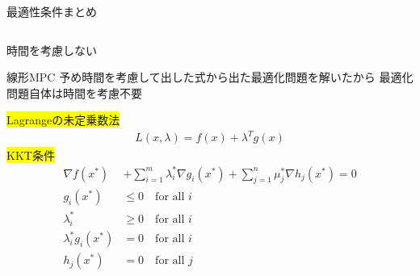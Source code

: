 \documentclass[dvipdfmx,12pt]{beamer}
\begin{document}
    \begin{frame}{最適性条件まとめ}
        \fontsize{6.5pt}{6.5pt}\selectfont
        
        \begin{columns}
            \begin{column}{.6\textwidth}
                \begin{itembox}[l]{時間を考慮しない}
                    \begin{itembox}[l]{線形MPC}
                        予め時間を考慮して出した式から出た最適化問題を解いたから
                        最適化問題自体は時間を考慮不要\\
                    \end{itembox}
                    \colorbox{yellow}{Lagrangeの未定乗数法}\\
                    \begin{align*}
                        L(x, \lambda) = f(x) + \lambda^T g(x)
                    \end{align*}
                    \colorbox{yellow}{KKT条件}\\
                    \begin{align*}
                        \nabla f(x^*) &+ \sum_{i=1}^m \lambda_i^* \nabla g_i(x^*) + \sum_{j=1}^n \mu_j^* \nabla h_j(x^*) = 0 \\
                        g_i(x^*) &\leq 0 \quad \text{for all } i \\
                        \lambda_i^* &\geq 0 \quad \text{for all } i \\
                        \lambda_i^* g_i(x^*) &= 0 \quad \text{for all } i \\
                        h_j(x^*) &= 0 \quad \text{for all } j
                    \end{align*}
                \end{itembox}
            \end{column}


\end{columns}
\end{frame}
\end{document}
